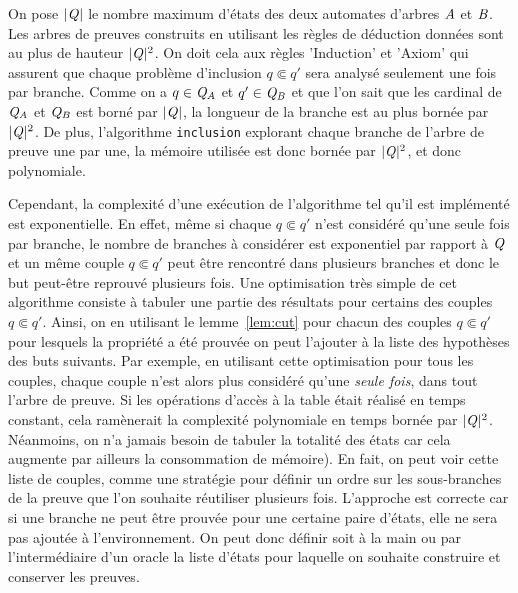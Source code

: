 On pose $|\mathit Q|$ le nombre maximum d'états des deux automates d'arbres $\mathit A$ et $\mathit B$.  Les arbres de preuves
construits en utilisant les règles de déduction données sont au plus de hauteur $|\mathit Q|^2$.
On doit cela aux règles 'Induction' et 'Axiom' qui assurent que chaque problème d'inclusion $q \Subset q'$
sera analysé seulement une fois par branche. 
Comme on a $q\in \mathit Q_\mathit A$ et $q' \in \mathit Q_\mathit B$ et que l'on sait que les cardinal de $\mathit Q_\mathit A$ et
$\mathit Q_\mathit B$ est borné par $|\mathit Q|$, la longueur de la branche est au plus bornée par 
$|\mathit Q|^2$.  De plus, l'algorithme \lstinline!inclusion! explorant chaque branche 
de l'arbre de preuve une par une, la mémoire utilisée est donc bornée par $|\mathit Q|^2$,
et donc polynomiale.

Cependant, la complexité d'une exécution de l'algorithme tel qu'il est implémenté est exponentielle.
En effet, même si chaque $q \Subset q'$ n'est considéré qu'une seule fois par branche,
le nombre de branches à considérer est exponentiel par rapport à 
$\mathit Q$ et un même couple $q \Subset q'$ peut être rencontré dans plusieurs branches
et donc le but peut-être reprouvé plusieurs fois.
Une optimisation très simple de cet algorithme consiste à tabuler une partie des résultats
pour certains des couples $q \Subset q'$. Ainsi, on en utilisant le lemme~\ref{lem:cut}
pour chacun des couples $q \Subset q'$ pour lesquels la propriété a été prouvée on peut l'ajouter
à la liste des hypothèses des buts suivants. 
Par exemple, en utilisant cette optimisation pour tous les couples,
chaque couple n'est alors plus considéré qu'une {\em seule fois}, dans tout l'arbre de preuve.
Si les opérations d'accès à la table était réalisé en temps constant, 
cela ramènerait la complexité polynomiale en temps bornée par $|\mathit Q|^2$. 
Néanmoins, on n'a jamais besoin de tabuler la totalité des états car cela augmente par ailleurs
la consommation de mémoire). En fait, on peut voir cette liste de couples, comme une stratégie
pour définir un ordre sur les sous-branches de la preuve que l'on souhaite réutiliser plusieurs fois.
L'approche est correcte car si une branche ne peut être prouvée pour une certaine paire d'états, 
elle ne sera pas ajoutée à l'environnement. On peut donc définir soit à la main ou par l'intermédiaire
d'un oracle la liste d'états pour laquelle on souhaite construire et conserver les preuves.



